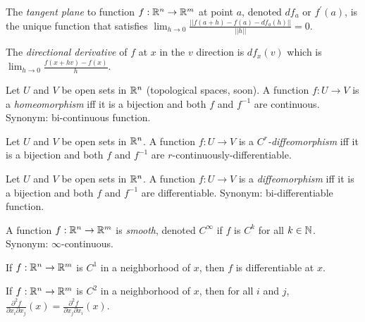 \documentclass[11pt,leqno,oneside]{amsart}
\begin{document}
\begin{defn}
	The \emph{tangent plane} to function $f : {\mathbb R}^n \to {\mathbb R}^m$ at point $a$, denoted $df_a$ or $f^{\prime}(a)$, is the unique function that satisfies $\lim_{h\to 0} \frac{||f(a+h) - f(a) - df_a(h)||}{||h||} = 0$.
\end{defn}
\begin{defn}
	The \emph{directional derivative} of $f$ at $x$ in the $v$ direction is $df_x(v)$ which is $\lim_{h\to 0} \frac{f(x+hv) - f(x)}{h}$.
\end{defn}
\begin{defn}
	Let $U$ and $V$ be open sets in ${\mathbb R}^n$ (topological spaces, soon).  A function $f:U\to V$ is a \emph{homeomorphism} iff it is a bijection and both $f$ and $f^{-1}$ are continuous.
	Synonym: bi-continuous function.
\end{defn}
\begin{defn}
	Let $U$ and $V$ be open sets in ${\mathbb R}^n$.  A function $f:U\to V$ is a \emph{$C^r$-diffeomorphism} iff it is a bijection and both $f$ and $f^{-1}$ are $r$-continuously-differentiable.
\end{defn}
\begin{defn}
	Let $U$ and $V$ be open sets in ${\mathbb R}^n$.  A function $f:U\to V$ is a \emph{diffeomorphism} iff it is a bijection and both $f$ and $f^{-1}$ are differentiable.
	Synonym: bi-differentiable function.
\end{defn}
\begin{defn}
	A function $f:{\mathbb R}^n \to {\mathbb R}^m$ is \emph{smooth}, denoted $C^\infty$ if $f$ is $C^k$ for all $k \in {\mathbb N}$.
	Synonym: $\infty$-continuous.
\end{defn}
\begin{thm}
	If $f:{\mathbb R}^n \to {\mathbb R}^m$ is $C^1$ in a neighborhood of $x$, then $f$ is differentiable at $x$.
\end{thm}
\begin{thm}
	If $f:{\mathbb R}^n \to {\mathbb R}^m$ is $C^2$ in a neighborhood of $x$, then for all $i$ and $j$, $\frac{\partial^2f}{\partial x_i \partial x_j}(x) = \frac{\partial^2f}{\partial x_j \partial x_i}(x)$.
\end{thm}
\end{document}
